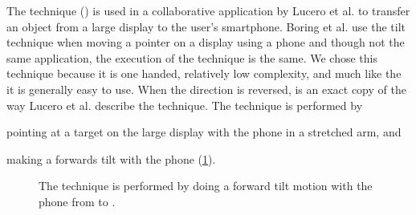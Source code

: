 The \tilt technique () is used in a collaborative application by Lucero et al. \cite{Lucero:2012} to transfer an object from a large display to the user's smartphone.
Boring et al. \cite{Boring:2009} use the tilt technique when moving a pointer on a display using a phone and though not the same application, the execution of the technique is the same.
We chose this technique because it is one handed, relatively low complexity, and much like the \swipe it is generally easy to use.
When the direction is reversed, \tilt is an exact copy of the way Lucero et al. describe the technique.
The \tilt technique is performed by 
\begin{enumerate*}[label=\itshape\arabic*\upshape)]
	\item{pointing at a target on the large display with the phone in a stretched arm, and}
	\item{making a forwards tilt with the phone (\cref{fig:tiltTechnique}).}
\end{enumerate*}

\begin{figure}[H]
\caption{The \tilt technique is performed by doing a forward tilt motion with the phone from \protect{} to \protect{}.}
\label{fig:tiltTechnique}
\end{figure}

